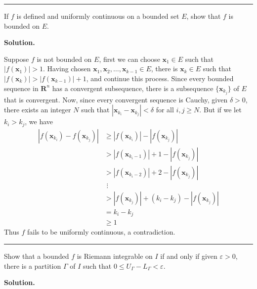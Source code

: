 \documentclass[12pt]{article}
\theoremstyle{definition}
\begin{document}
\bigskip\noindent\hrule\bigskip

If $f$ is defined and uniformly continuous on a bounded set $E$, show that $f$ is bounded on $E$.

\smallskip
\noindent\textbf{Solution.}\quad

Suppose $f$ is not bounded on $E$, first we can choose $\mathbf{x}_1\in E$ such that $\left\vert f(\mathbf{x}_1)\right\vert>1$. Having chosen $\mathbf{x}_1,\mathbf{x}_2,\ldots,\mathbf{x}_{k-1}\in E$, there is $\mathbf{x}_k\in E$ such that $\left\vert f(\mathbf{x}_k)\right\vert>\left\vert f(\mathbf{x}_{k-1})\right\vert+1$, and continue this process. Since every bounded sequence in $\mathbf{R}^n$ has a convergent subsequence, there is a subsequence $\{\mathbf{x}_{k_j}\}$ of $E$ that is convergent. Now, since every convergent sequence is Cauchy, given $\delta>0$, there exists an integer $N$ such that $\left\vert\mathbf{x}_{k_i}-\mathbf{x}_{k_j}\right\vert<\delta$ for all $i,j\ge N$. But if we let $k_i>k_j$, we have
\begin{align*}
\left\vert f(\mathbf{x}_{k_i})-f(\mathbf{x}_{k_j})\right\vert
&\ge \left\vert f(\mathbf{x}_{k_i})\right\vert-\left\vert f(\mathbf{x}_{k_j})\right\vert \\
&>\left\vert f(\mathbf{x}_{k_i-1})\right\vert+1-\left\vert f(\mathbf{x}_{k_j})\right\vert \\
&>\left\vert f(\mathbf{x}_{k_i-2})\right\vert+2-\left\vert f(\mathbf{x}_{k_j})\right\vert \\
&\,\,\vdots \\
&>\left\vert f(\mathbf{x}_{k_j})\right\vert+(k_i-k_j)-\left\vert f(\mathbf{x}_{k_j})\right\vert \\
&=k_i-k_j \\
&\ge 1
\end{align*}
Thus $f$ fails to be uniformly continuous, a contradiction.



\bigskip\noindent\hrule\bigskip

Show that a bounded $f$ is Riemann integrable on $I$ if and only if given $\varepsilon>0$, there is a partition $\Gamma$ of $I$ such that $0\le U_\Gamma-L_\Gamma<\varepsilon$.

\smallskip
\noindent\textbf{Solution.}\quad
\end{document}
